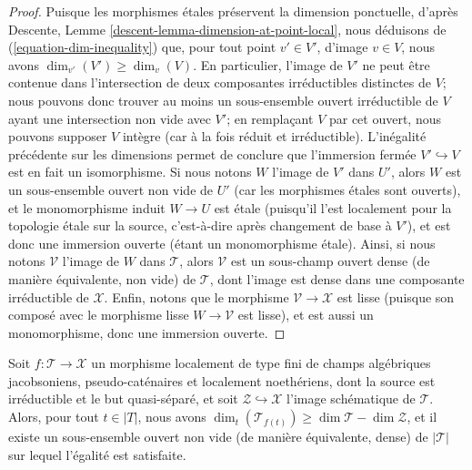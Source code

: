 \begin{proof}
\medskip\noindent
Puisque les morphismes étales préservent la dimension ponctuelle, d'après
Descente, Lemme \ref{descent-lemma-dimension-at-point-local},
nous déduisons de (\ref{equation-dim-inequality})
que, pour tout point $v' \in V'$,
d'image $v \in V$, nous avons
$\dim_{v'}( V') \geq \dim_v(V)$.
En particulier, l'image de $V'$ ne peut être contenue dans l'intersection
de deux composantes irréductibles distinctes de $V$; nous pouvons donc trouver
au moins un sous-ensemble ouvert irréductible de $V$ ayant une intersection non vide
avec $V'$; en remplaçant $V$ par cet ouvert, nous pouvons supposer $V$ intègre
(car à la fois réduit et irréductible). L'inégalité précédente
sur les dimensions permet de conclure que l'immersion fermée $V' \hookrightarrow V$
est en fait un isomorphisme.
Si nous notons $W$ l'image de $V'$
dans $U'$, alors $W$ est un sous-ensemble
ouvert non vide de $U'$ (car les morphismes étales sont ouverts),
et le monomorphisme induit $W \to U$ est étale
(puisqu'il l'est localement pour la topologie étale sur la source, c'est-à-dire après changement de base
à $V'$), et est donc une immersion ouverte (étant un monomorphisme étale).
Ainsi, si nous notons $\mathcal{V}$ l'image de $W$ dans $\mathcal{T}$,
alors $\mathcal{V}$ est un sous-champ ouvert dense (de manière équivalente, non vide) de
$\mathcal{T}$,
dont l'image est dense dans une composante irréductible de $\mathcal{X}$.
Enfin,
notons que le morphisme $\mathcal{V} \to \mathcal{X}$ est lisse
(puisque son composé
avec le morphisme lisse $W\to \mathcal{V}$ est lisse),
et est aussi un monomorphisme, donc une immersion ouverte.
\end{proof}

\begin{lemma}
\label{lemma-dims-of-images}
Soit $f: \mathcal{T} \to \mathcal{X}$ un morphisme localement de type fini
de champs algébriques jacobsoniens, pseudo-caténaires et localement
noethériens,
dont la source est irréductible et le but quasi-séparé,
et soit $\mathcal{Z} \hookrightarrow \mathcal{X}$ l'image
schématique de $\mathcal{T}$.
Alors, pour tout $t \in |T|$,
nous avons
$\dim_t( \mathcal{T}_{f(t)}) \geq \dim \mathcal{T}  - \dim \mathcal{Z}$,
et il existe un sous-ensemble ouvert non vide (de manière équivalente, dense)
de $|\mathcal{T}|$ sur lequel l'égalité est satisfaite.
\end{lemma}

